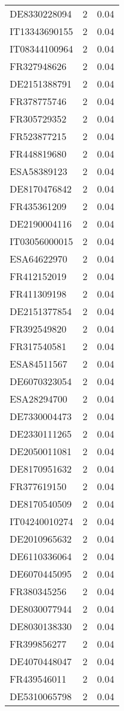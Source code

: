 \begin{table*}[htbp]
\begin{tabular}{lrr}
DE8330228094 & 2 & 0.04 \\
IT13343690155 & 2 & 0.04 \\
IT08344100964 & 2 & 0.04 \\
FR327948626 & 2 & 0.04 \\
DE2151388791 & 2 & 0.04 \\
FR378775746 & 2 & 0.04 \\
FR305729352 & 2 & 0.04 \\
FR523877215 & 2 & 0.04 \\
FR448819680 & 2 & 0.04 \\
ESA58389123 & 2 & 0.04 \\
DE8170476842 & 2 & 0.04 \\
FR435361209 & 2 & 0.04 \\
DE2190004116 & 2 & 0.04 \\
IT03056000015 & 2 & 0.04 \\
ESA64622970 & 2 & 0.04 \\
FR412152019 & 2 & 0.04 \\
FR411309198 & 2 & 0.04 \\
DE2151377854 & 2 & 0.04 \\
FR392549820 & 2 & 0.04 \\
FR317540581 & 2 & 0.04 \\
ESA84511567 & 2 & 0.04 \\
DE6070323054 & 2 & 0.04 \\
ESA28294700 & 2 & 0.04 \\
DE7330004473 & 2 & 0.04 \\
DE2330111265 & 2 & 0.04 \\
DE2050011081 & 2 & 0.04 \\
DE8170951632 & 2 & 0.04 \\
FR377619150 & 2 & 0.04 \\
DE8170540509 & 2 & 0.04 \\
IT04240010274 & 2 & 0.04 \\
DE2010965632 & 2 & 0.04 \\
DE6110336064 & 2 & 0.04 \\
DE6070445095 & 2 & 0.04 \\
FR380345256 & 2 & 0.04 \\
DE8030077944 & 2 & 0.04 \\
DE8030138330 & 2 & 0.04 \\
FR399856277 & 2 & 0.04 \\
DE4070448047 & 2 & 0.04 \\
FR439546011 & 2 & 0.04 \\
DE5310065798 & 2 & 0.04 \\

\end{tabular}
\end{table*}
